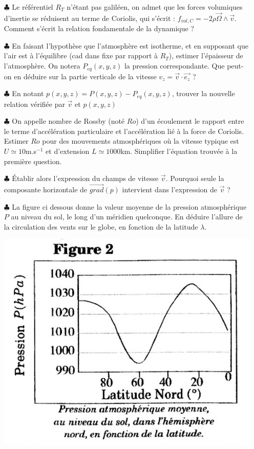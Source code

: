 \documentclass{report}
\begin{document}
\begin{itemize}

	\item[$\clubsuit$] Le référentiel $R_T$ n'étant pas galiléen, on admet que les forces volumiques d'inertie se réduisent au terme de Coriolis, qui s'écrit : $f_{vol, C}=-2\rho\vec{\Omega}\wedge\vec{v}$. Comment s'écrit la relation fondamentale de la dynamique ?
	
	\item[$\clubsuit$] En faisant l'hypothèse que l'atmosphère est isotherme, et en supposant que l'air est à l'équilibre (cad dans fixe par rapport à $R_T$), estimer l'épaisseur de l'atmosphère. On notera $P_{eq}(x,y,z)$ la pression correspondante. Que peut-on en déduire sur la partie verticale de la vitesse $v_z=\vec{v}\cdot\vec{e_z}$ ?
	
	\item[$\clubsuit$] En notant $p(x,y,z)=P(x,y,z)-P_{eq}(x,y,z)$, trouver la nouvelle relation vérifiée par $\vec{v}$ et $p(x,y,z)$
	
	\item[$\clubsuit$] On appelle nombre de Rossby (noté $Ro$) d'un écoulement le rapport entre le terme d'accélération particulaire et l'accélération lié à la force de Coriolis. Estimer $Ro$ pour des mouvements atmosphériques où la vitesse typique est $U\simeq10$m.s$^{-1}$ et d'extension $L\simeq1000$km. Simplifier l'équation trouvée à la première question.
	
	\item[$\clubsuit$] Établir alors l'expression du champs de vitesse $\vec{v}$. Pourquoi seule la composante horizontale de $\vec{grad}(p)$ intervient dans l'expression de $\vec{v}$ ?
	
	\item[$\clubsuit$] La figure ci dessous donne la valeur moyenne de la pression atmosphérique $P$ au niveau du sol, le long d'un méridien quelconque. En déduire l'allure de la circulation des vents sur le globe, en fonction de la latitude $\lambda$.
	
\begin{center}
	\includegraphics[scale=0.3]{meca_flu5bis.png}
\end{center}	
	

\end{itemize}
\end{document}
